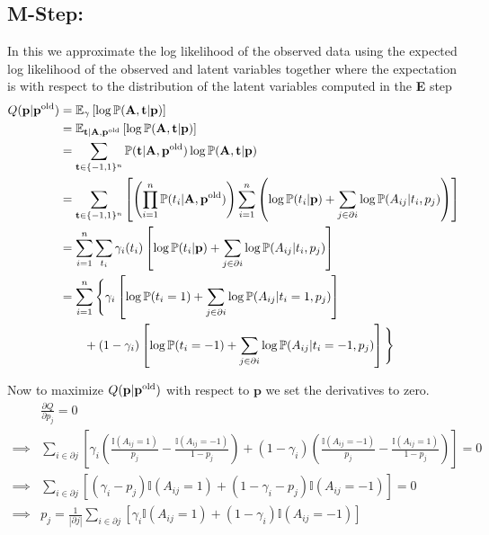 \documentclass[12pt,onecolumn,letterpaper]{article}
\begin{document}
\subsection*{M-Step:}
In this we approximate the log likelihood of the observed data using the expected log likelihood of the observed and latent variables together where the expectation is with respect to the distribution of the latent variables computed in the \textbf{E} step
\begin{align*}
Q(\textbf{p}|\textbf{p}^{{\rm old}}) &= 
\mathbb{E}_{
{\bf \gamma}
}
\left[
\log{
\mathbb{P}(\textbf{A},\textbf{t}|\textbf{p})
}
\right] \\
&=
\mathbb{E}_{
\textbf{t}|\textbf{A},\textbf{p}^{{\rm old}}
}
\left[
\log{
\mathbb{P}(\textbf{A},\textbf{t}|\textbf{p})
}
\right] \\
&=
\sum_{\textbf{t}\in \{-1,1\}^n} 
\mathbb{P}(\textbf{t}|\textbf{A},\textbf{p}^{{\rm old}})
\log{
\mathbb{P}(\textbf{A},\textbf{t}|\textbf{p})
} \\
&= 
\sum_{\textbf{t}\in \{-1,1\}^n}
\left[
\left(
\prod_{i=1}^{n} \mathbb{P}(t_i|\textbf{A},\textbf{p}^{{\rm old}})
\right)
\sum_{i=1}^{n}
\left(
\log{\mathbb{P}(t_i|\textbf{p})} +
\sum_{j\in \partial i} 
\log \mathbb{P}(A_{ij}|t_i,p_j) 
\right)
\right] \\
&=
\sum_{i=1}^{n}
\sum_{t_i} \gamma_i(t_i) 
\left[
\log{\mathbb{P}(t_i|\textbf{p})} +
\sum_{j\in \partial i} 
\log \mathbb{P}(A_{ij}|t_i,p_j) 
\right] \\
&=
\sum_{i=1}^{n}
\Bigg\{\gamma_i 
\left[
\log{\mathbb{P}(t_i=1)} +
\sum_{j\in \partial i} 
\log \mathbb{P}(A_{ij}|t_i=1,p_j) 
\right]\\
&\qquad+(1-\gamma_i)
\left[
\log{\mathbb{P}(t_i=-1)} +
\sum_{j\in \partial i} 
\log \mathbb{P}(A_{ij}|t_i=-1,p_j) 
\right]
\Bigg\}
\end{align*}

\noindent
Now to maximize $Q(\textbf{p}|\textbf{p}^{{\rm old}})$ with respect to $\textbf{p}$ we set the derivatives to zero.
\begin{align*}
& \frac{\partial{Q}}{\partial{p_j}} = 0 \\
\implies &
\sum_{i\in \partial j} 
\left[
\gamma_i
\left(
\frac{\mathbb{I}(A_{ij}=1)}{p_j} -
\frac{\mathbb{I}(A_{ij}=-1)}{1-p_j}
\right) +
\left(1-\gamma_i\right)
\left(
\frac{\mathbb{I}(A_{ij}=-1)}{p_j} -
\frac{\mathbb{I}(A_{ij}=1)}{1-p_j}
\right) 
\right]
= 0 \\
\implies &
\sum_{i\in \partial j} 
\left[
\left(
\gamma_i-p_j
\right) 
\mathbb{I}(A_{ij}=1) +
\left(
1-\gamma_i - p_j
\right) 
\mathbb{I}(A_{ij}=-1)
\right] 
= 0 \\
\implies &
p_j = 
\frac{1}{|\partial j|}
\sum_{i\in \partial j} 
\left[\gamma_i
\mathbb{I}(A_{ij}=1) +
\left(
1-\gamma_i
\right) 
\mathbb{I}(A_{ij}=-1)\right]
\end{align*}
\end{document}
